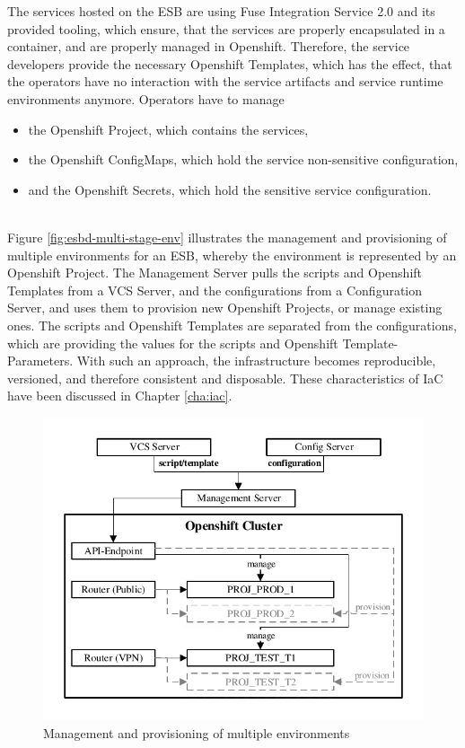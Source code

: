 The services hosted on the ESB are using Fuse Integration Service 2.0 and its provided tooling, which ensure, that the services are properly encapsulated in a container, and are properly managed in Openshift. Therefore, the service developers provide the necessary Openshift Templates, which has the effect, that the operators have no interaction with the service artifacts and service runtime environments anymore. Operators have to manage
\begin{itemize}
	\item the Openshift Project, which contains the services,
	\item the Openshift ConfigMaps, which hold the service non-sensitive configuration,
	\item and the Openshift Secrets, which hold the sensitive service configuration.
\end{itemize} 
\ \\
Figure \vref{fig:esbd-multi-stage-env} illustrates the management and provisioning of multiple environments for an ESB, whereby the environment is represented by an Openshift Project. The Management Server pulls the scripts and Openshift Templates from a VCS Server, and the configurations from a Configuration Server, and uses them to provision new Openshift Projects, or manage existing ones. The scripts and Openshift Templates are separated from the configurations, which are providing the values for the scripts and Openshift Template-Parameters. With such an approach, the infrastructure becomes reproducible, versioned, and therefore consistent and disposable. These characteristics of IaC have been discussed in Chapter \vref{cha:iac}.
\newpage 

\begin{figure}
	\centering
	\includegraphics[scale=1]{images/esbd-multi-stage-env.pdf}
	\caption{Management and provisioning of multiple environments}
	\label{fig:esbd-multi-stage-env}
\end{figure}


